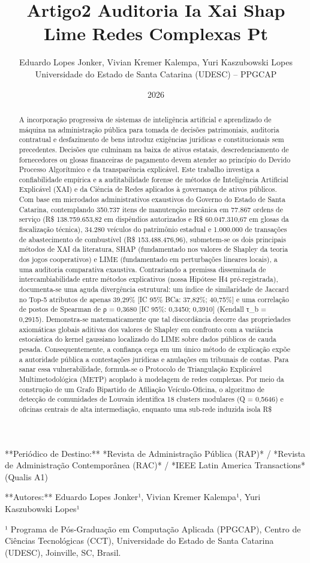 \documentclass[10pt,a4paper,journal]{article}
\title{Artigo2 Auditoria Ia Xai Shap Lime Redes Complexas Pt}
\author{Eduardo Lopes Jonker, Vivian Kremer Kalempa, Yuri Kaszubowski Lopes\\ \small Universidade do Estado de Santa Catarina (UDESC) -- PPGCAP}
\date{2026}
\begin{document}
\maketitle

**Periódico de Destino:** *Revista de Administração Pública (RAP)* / *Revista de Administração Contemporânea (RAC)* / *IEEE Latin America Transactions* (Qualis A1)

**Autores:** Eduardo Lopes Jonker¹, Vivian Kremer Kalempa¹, Yuri Kaszubowski Lopes¹

¹ Programa de Pós-Graduação em Computação Aplicada (PPGCAP), Centro de Ciências Tecnológicas (CCT), Universidade do Estado de Santa Catarina (UDESC), Joinville, SC, Brasil.

\begin{abstract}
A incorporação progressiva de sistemas de inteligência artificial e aprendizado de máquina na administração pública para tomada de decisões patrimoniais, auditoria contratual e desfazimento de bens introduz exigências jurídicas e constitucionais sem precedentes. Decisões que culminam na baixa de ativos estatais, descredenciamento de fornecedores ou glosas financeiras de pagamento devem atender ao princípio do Devido Processo Algorítmico e da transparência explicável. Este trabalho investiga a confiabilidade empírica e a auditabilidade forense de métodos de Inteligência Artificial Explicável (XAI) e da Ciência de Redes aplicados à governança de ativos públicos. Com base em microdados administrativos exaustivos do Governo do Estado de Santa Catarina, contemplando 350.737 itens de manutenção mecânica em 77.867 ordens de serviço (R\$ 138.759.653,82 em dispêndios autorizados e R\$ 60.047.310,67 em glosas da fiscalização técnica), 34.280 veículos do patrimônio estadual e 1.000.000 de transações de abastecimento de combustível (R\$ 153.488.476,96), submetem-se os dois principais métodos de XAI da literatura, SHAP (fundamentado nos valores de Shapley da teoria dos jogos cooperativos) e LIME (fundamentado em perturbações lineares locais), a uma auditoria comparativa exaustiva. Contrariando a premissa disseminada de intercambiabilidade entre métodos explicativos (nossa Hipótese H4 pré-registrada), documenta-se uma aguda divergência estrutural: um índice de similaridade de Jaccard no Top-5 atributos de apenas 39,29\% [IC 95\% BCa: 37,82\%; 40,75\%] e uma correlação de postos de Spearman de ρ = 0,3680 [IC 95\%: 0,3450; 0,3910] (Kendall τ\_b = 0,2915). Demonstra-se matematicamente que tal discordância decorre das propriedades axiomáticas globais aditivas dos valores de Shapley em confronto com a variância estocástica do kernel gaussiano localizado do LIME sobre dados públicos de cauda pesada. Consequentemente, a confiança cega em um único método de explicação expõe a autoridade pública a contestações jurídicas e anulações em tribunais de contas. Para sanar essa vulnerabilidade, formula-se o Protocolo de Triangulação Explicável Multimetodológica (METP) acoplado à modelagem de redes complexas. Por meio da construção de um Grafo Bipartido de Afiliação Veículo-Oficina, o algoritmo de detecção de comunidades de Louvain identifica 18 clusters modulares (Q = 0,5646) e oficinas centrais de alta intermediação, enquanto uma sub-rede induzida isola R\$ 
\end{abstract}
\end{document}
